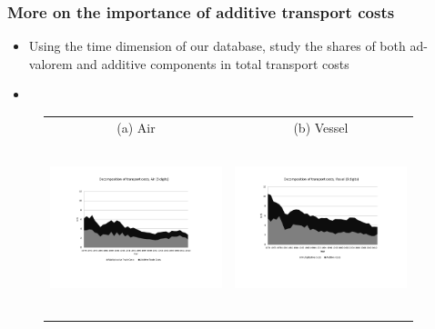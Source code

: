 \documentclass[10 pt,Helvetica, french]{beamer}
\begin{document}
\begin{frame}[label=slide_fig1]
\frametitle{More on the importance of additive transport costs}
\begin{itemize}
\item Using the time dimension of our database, study the shares of both ad-valorem and additive components in total transport costs
\item[] \hyperlink{slide_moreonfig1}{}
\end{itemize}
\begin{figure}[htbp]
\begin{center}
\begin{tabular}{cc}
{\scriptsize (a) Air } & {\scriptsize  (b) Vessel}\\
\includegraphics[width=5cm, height=5cm]{Fig2a_decompTC_air_3d.pdf}
& \includegraphics[width=5cm,height=5cm]{Fig2b_decompTC_vessel_3d.pdf} \\
\end{tabular}
\end{center}
\end{figure}
\end{frame}
\end{document}
